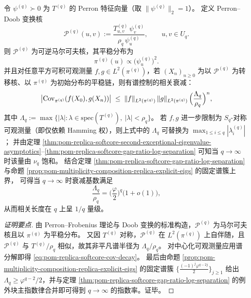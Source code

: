 \begin{theorem}\label{thm:pom-replica-softcore-doob-reversible-markov-corr}
令 \(\psi^{(q)}\succ 0\) 为 \(T^{(q)}\) 的 Perron 特征向量（取 \(\|\psi^{(q)}\|_2=1\)）。
定义 Perron--Doob 变换核
\[
\mathcal{P}^{(q)}(u,v)
:=\frac{T^{(q)}_{u,v}\,\psi^{(q)}_{v}}{\rho_q\,\psi^{(q)}_{u}},
\qquad u,v\in U_q.
\]
则 \(\mathcal{P}^{(q)}\) 为可逆马尔可夫核，其平稳分布为
\[
\pi^{(q)}(u)\propto \bigl(\psi^{(q)}_{u}\bigr)^2.
\]
并且对任意平方可积可观测量 \(f,g\in L^2(\pi^{(q)})\)，若 \((X_n)_{n\ge 0}\) 为以 \(\mathcal{P}^{(q)}\) 为转移核、以 \(\pi^{(q)}\) 为初始分布的平稳链，则有谱控制的相关衰减：
\begin{equation}\label{eq:pom-replica-softcore-cov-decay}
\bigl|\mathrm{Cov}_{\pi^{(q)}}(f(X_0),g(X_n))\bigr|
\;\le\;
\|f\|_{L^2(\pi^{(q)})}\,\|g\|_{L^2(\pi^{(q)})}\,
\Bigl(\frac{\Lambda_q}{\rho_q}\Bigr)^{n},
\end{equation}
其中 \(\Lambda_q:=\max\{|\lambda|:\lambda\in\mathrm{spec}(T^{(q)}),\ |\lambda|<\rho_q\}\)。
若 \(f,g\) 进一步限制为 \(S_q\)-对称可观测量（即仅依赖 Hamming 权），则上式中的 \(\Lambda_q\) 可替换为
\(
\max_{1\le i\le q}|\lambda_i^{(q)}|
\)；
并由定理 \ref{thm:pom-replica-softcore-second-exceptional-eigenvalue-asymptotics}--\ref{thm:pom-replica-softcore-gap-ratio-log-separation} 可知当 \(q\to\infty\) 时该量由 \(\nu_q\) 饱和。
结合定理 \ref{thm:pom-replica-softcore-gap-ratio-log-separation} 与命题 \ref{prop:pom-multiplicity-composition-replica-explicit-eigs} 的固定谱簇上界，
可得当 \(q\to\infty\) 时衰减基数满足
\[
\frac{\Lambda_q}{\rho_q}
=\Big(\frac{\varphi}{2}\Big)^q\bigl(1+o(1)\bigr),
\]
从而相关长度在 \(q\) 上呈 \(1/q\) 量级。
\end{theorem}
\begin{proof}[证明要点]
由 Perron--Frobenius 理论与 Doob 变换的标准构造，\(\mathcal{P}^{(q)}\) 为马尔可夫核且以 \(\pi^{(q)}\) 为平稳分布。
又因 \(T^{(q)}\) 对称，\(\mathcal{P}^{(q)}\) 在 \(L^2(\pi^{(q)})\) 上自伴随，且
\(
\mathcal{P}^{(q)}
\)
与
\(
T^{(q)}/\rho_q
\)
相似，故其非平凡谱半径为 \(\Lambda_q/\rho_q\)。
对中心化可观测量应用谱分解即得 \eqref{eq:pom-replica-softcore-cov-decay}。
最后由命题 \ref{prop:pom-multiplicity-composition-replica-explicit-eigs} 的固定谱簇
\(\bigl\{ \frac{(-1)^j\varphi^{q-2j}}{2}\bigr\}_{j\ge 1}\)
给出 \(\Lambda_q\ge \varphi^{q-2}/2\)，并与定理 \ref{thm:pom-replica-softcore-gap-ratio-log-separation} 的例外块主指数律合并即可得到 \(q\to\infty\) 的指数率。证毕。
\end{proof}

